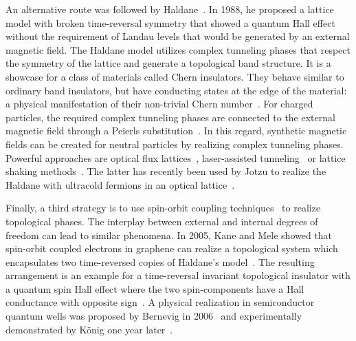 An alternative route was followed by Haldane~\cite{Haldane1988}.
In 1988, he proposed a lattice model with broken time-reversal symmetry that showed a quantum Hall effect without the requirement of Landau levels that would be generated by an external magnetic field.
The Haldane model utilizes complex tunneling phases that respect the symmetry of the lattice and generate a topological band structure.
It is a showcase for a class of materials called Chern insulators.
They behave similar to ordinary band insulators, but have conducting states at the edge of the material: a physical manifestation of their non-trivial Chern number~\cite{Hatsugai1993}.
For charged particles, the required complex tunneling phases are connected to the external magnetic field through a Peierls substitution~\cite{Peierls1933}.
In this regard, synthetic magnetic fields can be created for neutral particles by realizing complex tunneling phases.
Powerful approaches are optical flux lattices~\cite{Cooper2011}, laser-assisted tunneling~\cite{Aidelsburger2011,Aidelsburger2013,Miyake2013} or lattice shaking methods~\cite{Struck2012,Struck2013}.
The latter has recently been used by Jotzu \etal to realize the Haldane  with ultracold fermions in an optical lattice~\cite{Jotzu2014}.

Finally, a third strategy is to use spin-orbit coupling techniques~\cite{Lin2011,Cheuk2012,Wang2012,Hamner2014,Jimenez-Garcia2015} to realize topological phases.
The interplay between external and internal degrees of freedom can lead to similar phenomena.
In 2005, Kane and Mele showed that spin-orbit coupled electrons in graphene can realize a topological system which encapsulates two time-reversed copies of Haldane's model~\cite{Kane2005a,Kane2005}.
The resulting arrangement is an example for a time-reversal invariant topological insulator with a quantum spin Hall effect where the two spin-components have a Hall conductance with opposite sign~\cite{Qi2011,Hasan2010}.
A physical realization in semiconductor quantum wells was proposed by Bernevig \etal in 2006~\cite{Bernevig2006a,Bernevig2006b} and experimentally demonstrated by König \etal one year later~\cite{Konig2007}.


%
